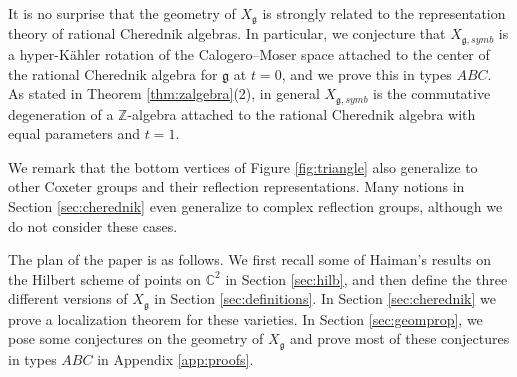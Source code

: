 \documentclass{amsart}
\numberwithin{equation}{section}
\theoremstyle{definition}
\newcommand{\fg}{\mathfrak{g}}
\newcommand{\C}{{\mathbb C}}
\newcommand{\Z}{{\mathbb Z}}
\begin{document}
It is no surprise that the geometry of $X_\fg$ is strongly related to the representation theory of rational Cherednik algebras. In particular, we conjecture that $X_{\fg,symb}$ is a hyper-Kähler rotation of the Calogero--Moser space attached to the center of the rational Cherednik algebra for $\fg$ at $t=0$, and we prove this in types $ABC$. As stated in Theorem \ref{thm:zalgebra}(2), in general $X_{\fg,symb}$ is the commutative degeneration of a $\Z$-algebra attached to the rational Cherednik algebra with equal parameters and $t=1$.

We remark that the bottom vertices of Figure \ref{fig:triangle} also generalize to other Coxeter groups and their reflection representations. Many notions in Section \ref{sec:cherednik} even generalize to complex reflection groups, although we do not consider these cases.

The plan of the paper is as follows. We first recall some of Haiman's results on the Hilbert scheme of points on $\C^2$ in Section \ref{sec:hilb}, and then define the three different versions of $X_\fg$ in Section \ref{sec:definitions}. 
In Section \ref{sec:cherednik} we prove a localization theorem for these varieties. 
In Section \ref{sec:geomprop}, we pose some conjectures on the geometry of $X_\fg$ and prove most of these conjectures in types $ABC$ in Appendix \ref{app:proofs}.
\end{document}
